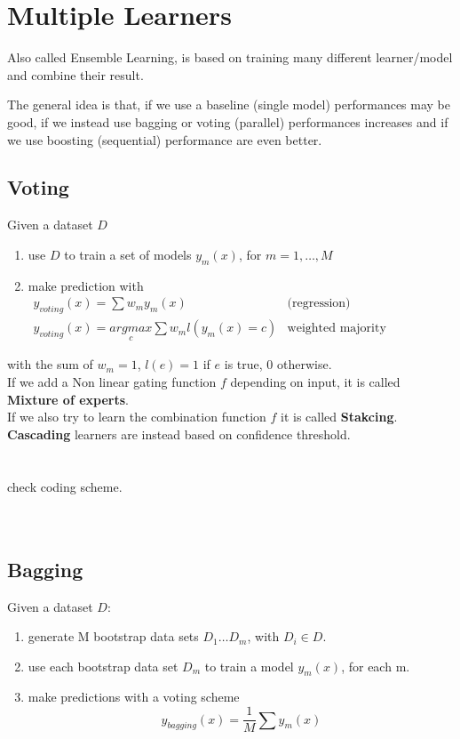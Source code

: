 \section{Multiple Learners}
Also called Ensemble Learning, is based on training many different learner/model and combine their result.

The general idea is that, if we use a baseline (single model) performances may be good, if we instead use bagging or voting (parallel) performances increases and if we use boosting (sequential) performance are even better.

\subsection{Voting}
Given a dataset $D$
\begin{enumerate}
    \item use $D$ to train a set of models $y_{m}(x)$, for $m = 1, \dots , M$
    \item make prediction with 
    \begin{equation}
        \begin{array}{lr}
             y_{voting}(x) = \sum w_{m}y_{m}(x) & \text{(regression)} \\
             y_{voting}(x) = \underset{c}{argmax}\sum w_{m}l(y_{m}(x)=c) & \text{weighted majority (classification)}
        \end{array}
    \end{equation}
\end{enumerate}
with the sum of $w_{m} = 1$, $l(e)=1$ if $e$ is true, 0 otherwise.\\
If we add a Non linear gating function $f$ depending on input, it is called \textbf{Mixture of experts}.\\
If we also try to learn the combination function $f$ it is called \textbf{Stakcing}.\\
\textbf{Cascading} learners are instead based on confidence threshold.\\
\\
\\
check coding scheme.\\
\\
\\
\subsection{Bagging}
Given a dataset $D$:
\begin{enumerate}
    \item generate M bootstrap data sets $D_{1} \dots D_{m}$, with $D_{i} \in D$.
    \item use each bootstrap data set $D_{m}$ to train a model $y_{m}(x)$, for each m.
    \item make predictions with a voting scheme
    \begin{equation}
        y_{bagging}(x) = \frac{1}{M} \sum y_{m}(x)
    \end{equation}
\end{enumerate}
